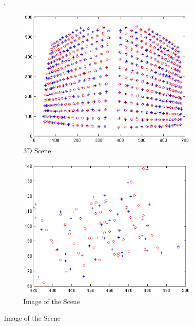 \documentclass{beamer}
\begin{document}
\begin{frame}

\begin{figure}
\setcounter{subfigure}{0}. 
	\begin{subfigure}[b]{.4\linewidth}
		\centering
		\includegraphics[width=.9\textwidth]{perturb_train}
		\caption{3D Scene}
	\end{subfigure}
	\begin{subfigure}[b]{.5\linewidth}
		\centering
		\includegraphics[width=.9\textwidth]{perturb_test}
		\caption{Image of the Scene}
	\end{subfigure}
\end{figure}
\end{frame}
\end{document}
